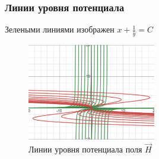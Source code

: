 \begin{frame}\frametitle{Линии уровня потенциала}
	Зелеными линиями изображен $x + \frac{1}{y} = C$
	\begin{figure}
		\centering
		\includegraphics[width=0.5\textwidth]{figures/potential_lines_plot.pdf}
		\caption{Линии уровня потенциала поля \(\vec H\)}\label{fig:potential_lines}
	\end{figure}

\end{frame}
